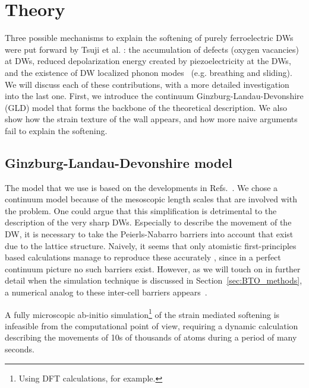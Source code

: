 \section{Theory \label{sec:BTO_theory}}
Three possible mechanisms to explain the softening of purely ferroelectric DWs were put forward by Tsuji et al. \cite{Tsuji2005}: the accumulation of defects (oxygen vacancies) at DWs, reduced depolarization energy created by piezoelectricity at the DWs, and the existence of DW localized phonon modes~\cite{Chen2020} (e.g. breathing and sliding). We will discuss each of these contributions, with a more detailed investigation into the last one.
First, we introduce the continuum Ginzburg-Landau-Devonshire (GLD) model that forms the backbone of the theoretical description.
We also show how the strain texture of the wall appears, and how more naive arguments fail to explain the softening.

\subsection{Ginzburg-Landau-Devonshire model}
The model that we use is based on the developments in Refs.~\cite{Zhirnov1959,L.N.Bulaevskii1963,Marton2010}.
We chose a continuum model because of the mesoscopic length scales that are involved with the problem.
One could argue that this simplification is detrimental to the description of the very sharp DWs.
Especially to describe the movement of the DW, it is necessary to take the Peierls-Nabarro barriers into account that exist due to the lattice structure.
Naively, it seems that only atomistic first-principles based calculations manage to reproduce these accurately \cite{Meyer2002}, since in a perfect continuum picture no such barriers exist.
However, as we will touch on in further detail when the simulation technique is discussed in Section~\ref{sec:BTO_methods}, a numerical analog to these inter-cell barriers appears~\cite{Marton2018}.

A fully microscopic ab-initio simulation\footnote{Using DFT calculations, for example.} of the strain mediated softening is infeasible from the computational point of view, requiring a dynamic calculation describing the movements of 10s of thousands of atoms during a period of many seconds.

